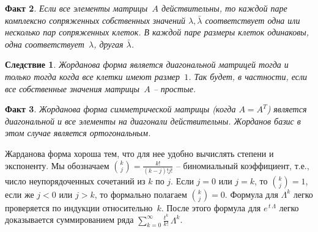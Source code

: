 \documentclass[12pt,a4paper]{article}
\newtheorem{cor}{Следствие}
\begin{document}
 \noindent \textbf{Факт 2}. {\em Если все элементы матрицы~$A$ действительны,   то каждой
 паре комплексно сопряженных собственных значений $\lambda, \bar \lambda$ соответствует одна или несколько пар
 сопряженных клеток. В каждой паре размеры клеток одинаковы, одна соответствует~$\lambda$, другая $\bar \lambda$.}
\smallskip

\begin{cor}\label{c.jor1}
Жорданова форма является диагональной матрицей тогда и только тогда когда все клетки имеют размер~$1$.
Так будет, в частности, если все собственные значения матрицы~$A$ -- простые.
\end{cor}
\smallskip

\noindent \textbf{Факт 3}. {\em Жорданова форма симметрической матрицы (когда $A = A^T$) является диагональной
и все элементы на диагонали действительны. Жорданов базис в этом случае является ортогональным.}
\smallskip

Жарданова форма хороша тем, что для нее удобно вычислять степени и экспоненту.
Мы обозначаем ${k \choose j} = \frac{k!}{(k-j)! j!}$ -- биномиальный коэффициент, т.е.,
число неупорядоченных сочетаний из $k$ по $j$. Если $j=0$ или $j=k$, то
${k \choose j} = 1$, если же $j < 0$ или $j > k$, то формально полагаем ${k \choose j} = 0$.
Формула для $\Lambda^k$ легко проверяется по индукции относительно~$k$. После этого формула
для $e^{\, t\, \Lambda}$ легко доказывается суммированием ряда $\sum_{k=0}^{\infty}\frac{t^k}{k!}\, \Lambda^k$.
\smallskip
\end{document}
